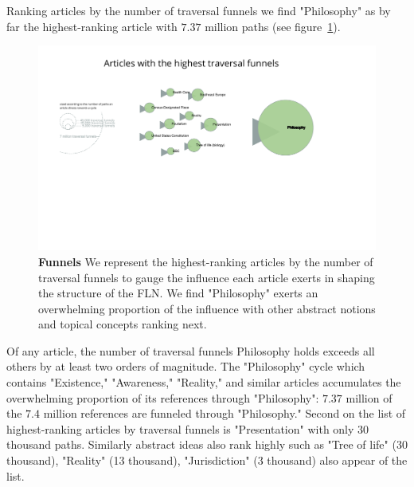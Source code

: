 \documentclass[pre,twocolumn,twoside,superscriptaddress,floatfix, aps, 10pt]{revtex4-1}
\begin{document}
Ranking articles by the number of traversal funnels we find 
"Philosophy" as by far the highest-ranking article with 
$7.37$ million paths
(see figure~\ref{fig:Funnels}).
\begin{figure}[tp!]
  \centering	
  \includegraphics[width=\textwidth]{graphics/funnels.pdf}
  \caption{
    \textbf{Funnels}
    We represent the highest-ranking articles by the number of traversal 
    funnels to gauge the influence each article exerts in shaping the 
    structure of the FLN. We find "Philosophy" exerts an overwhelming proportion
    of the influence with other abstract notions and topical concepts ranking
    next.
  }
  \label{fig:Funnels}
\end{figure}
Of any article, the number of traversal funnels Philosophy holds exceeds 
all others by at least two orders of magnitude.
The "Philosophy" cycle which contains "Existence," "Awareness," "Reality," 
and similar articles accumulates the overwhelming proportion of its 
references through "Philosophy": $7.37$ million of the $7.4$ million references
are funneled through "Philosophy."
Second on the list of highest-ranking articles by traversal funnels is 
"Presentation" with only $30$ thousand paths. Similarly abstract 
ideas also rank highly such as "Tree of life" (30 thousand), 
"Reality" (13 thousand), "Jurisdiction" (3 thousand) also appear of the list.
\end{document}
